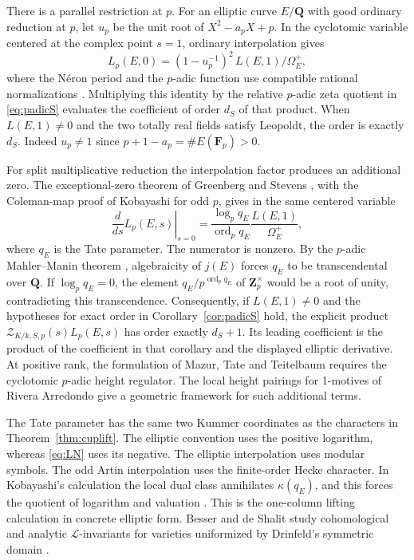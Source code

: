 \documentclass[11pt]{amsart}
\numberwithin{equation}{section}
\theoremstyle{definition}
\theoremstyle{remark}
\newcommand{\Q}{\mathbf Q}
\newcommand{\Z}{\mathbf Z}
\newcommand{\ord}{\operatorname{ord}}
\begin{document}
There is a parallel restriction at $p$. For an elliptic
curve $E/\Q$ with good ordinary reduction at $p$, let
$u_p$ be the unit root of $X^2-a_pX+p$. In the cyclotomic
variable centered at the complex point $s=1$, ordinary
interpolation gives
\[
 L_p(E,0)=(1-u_p^{-1})^2\,L(E,1)/\Omega_E^+ ,
\]
where the N\'eron period and the $p$-adic function use
compatible rational normalizations \cite{MTT}.
Multiplying this identity by the relative $p$-adic zeta
quotient in \eqref{eq:padicS} evaluates the coefficient
of order $d_S$ of that product. When $L(E,1)\ne0$ and the
two totally real fields satisfy Leopoldt, the order is
exactly $d_S$. Indeed $u_p\ne1$ since
$p+1-a_p=\#E(\mathbf F_p)>0$.

For split multiplicative reduction the interpolation factor
produces an additional zero. The exceptional-zero theorem of
Greenberg and Stevens \cite[Th.~0.3, $p\ge5$]{GS}, with the
Coleman-map proof of Kobayashi \cite[Th.~4.1 and Cor.~4.2]{Kobayashi}
for odd $p$, gives in the same centered variable
\[
 \left.\frac{d}{ds}L_p(E,s)\right|_{s=0}
   = \frac{\log_p q_E}{\ord_p q_E}\frac{L(E,1)}{\Omega_E^+},
\]
where $q_E$ is the Tate parameter. The numerator is nonzero. By the $p$-adic Mahler--Manin theorem
\cite{BDGP}, algebraicity of $j(E)$ forces $q_E$ to be
transcendental over $\Q$. If $\log_p q_E=0$, the element
$q_E/p^{\ord_p q_E}$ of $\Z_p^\times$ would be a root of unity,
contradicting this transcendence. Consequently, if $L(E,1)\ne0$
and the hypotheses for exact order in Corollary~\ref{cor:padicS}
hold, the explicit product
$\mathcal Z_{K/k,S,p}(s)L_p(E,s)$ has order exactly $d_S+1$.
Its leading coefficient is the product of the coefficient in that
corollary and the displayed elliptic derivative. At positive rank, the
formulation of Mazur, Tate and Teitelbaum requires the
cyclotomic $p$-adic height regulator. The local height
pairings for 1-motives of Rivera Arredondo \cite{Rivera}
give a geometric framework for such additional terms.

The Tate parameter has the same two Kummer coordinates as the
characters in Theorem~\ref{thm:cuplift}. The elliptic convention uses
the positive logarithm, whereas \eqref{eq:LN} uses its negative.
The elliptic interpolation uses modular symbols. The odd Artin
interpolation uses the finite-order Hecke character. In Kobayashi's
calculation the local dual class annihilates $\kappa(q_E)$, and
this forces the quotient of logarithm and valuation
\cite[eqs.~(3)--(6)]{Kobayashi}. This is the one-column lifting
calculation in concrete elliptic form. Besser and de Shalit study
cohomological and analytic $\mathcal L$-invariants for varieties
uniformized by Drinfeld's symmetric domain \cite{BesserShalit}.
\end{document}
